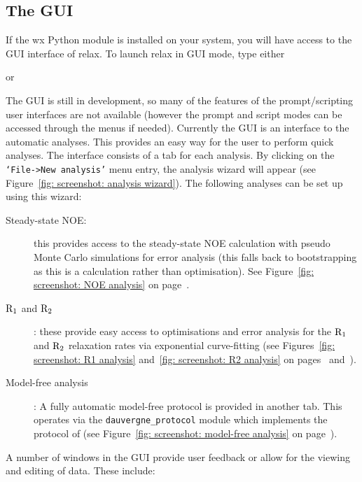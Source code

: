 
\subsection{The GUI}

If the wx Python module is installed on your system, you will have access to the GUI interface of relax.  To launch relax in GUI mode, type either


or


The GUI is still in development, so many of the features of the prompt/scripting user interfaces are not available (however the prompt and script modes can be accessed through the menus if needed).  Currently the GUI is an interface to the automatic analyses.  This provides an easy way for the user to perform quick analyses.  The interface consists of a tab for each analysis.  By clicking on the \texttt{`File->New analysis'} menu entry, the analysis wizard will appear (see Figure~\ref{fig: screenshot: analysis wizard}).  The following analyses can be set up using this wizard:

\begin{description}
\item[Steady-state NOE:]  this provides access to the steady-state NOE calculation with pseudo Monte Carlo simulations for error analysis (this falls back to bootstrapping as this is a calculation rather than optimisation).  See Figure~\ref{fig: screenshot: NOE analysis} on page~\pageref{fig: screenshot: NOE analysis}.
\item[$\mathrm{R}_1$ and $\mathrm{R}_2$]:  these provide easy access to optimisations and error analysis for the $\mathrm{R}_1$ and $\mathrm{R}_2$ relaxation rates via exponential curve-fitting (see Figures~\ref{fig: screenshot: R1 analysis} and~\ref{fig: screenshot: R2 analysis} on pages~\pageref{fig: screenshot: R1 analysis} and~\pageref{fig: screenshot: R2 analysis}).
\item[Model-free analysis]:  A fully automatic model-free protocol is provided in another tab.  This operates via the \texttt{dauvergne\_protocol} module which implements the protocol of \cite{dAuvergneGooley08b} (see Figure~\ref{fig: screenshot: model-free analysis} on page~\pageref{fig: screenshot: model-free analysis}).
\end{description}

A number of windows in the GUI provide user feedback or allow for the viewing and editing of data.  These include:

